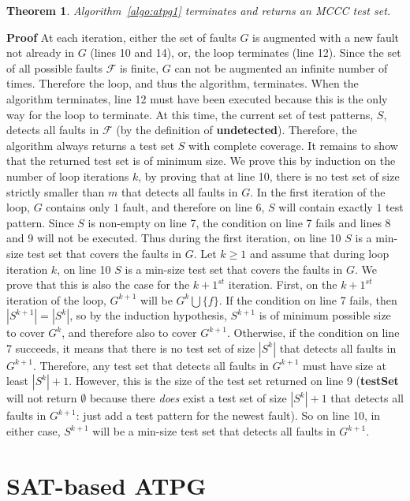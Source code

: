 \documentclass{article}
\newcommand{\MCCC}{\textsc{MCCC}\xspace}
\newcommand{\F}{\mathcal{F}}
\newtheorem{theorem}{Theorem}
\begin{document}
\begin{theorem}
Algorithm~\ref{algo:atpg1} terminates and returns an \MCCC test set.
\end{theorem}
\noindent \textbf{Proof} At each iteration, either the set of faults $G$ is augmented with a new fault not already in $G$ (lines 10 and 14), or, the loop terminates (line 12). Since the set of all possible faults $\F$ is finite, $G$ can not be augmented an infinite number of times. Therefore the loop, and thus the algorithm, terminates.  When the algorithm terminates, line 12 must have been executed because this is the only way for the loop to terminate. At this time, the current set of test patterns, $S$, detects all faults in $\F$ (by the definition of \textbf{undetected}). Therefore, the algorithm always returns a test set $S$ with complete coverage. It remains to show that the returned test set is of minimum size.  We prove this by induction on the number of loop iterations $k$, by proving that at line 10, there is no test set of size strictly smaller than $m$ that detects all faults in $G$. In the first iteration of the loop, $G$ contains only $1$ fault, and therefore on line 6, $S$ will contain exactly $1$ test pattern. Since $S$ is non-empty on line 7, the condition on line 7 fails and lines 8 and 9 will not be executed. Thus during the first iteration, on line 10 $S$ is a min-size test set that covers the faults in $G$. Let $k \geq 1$ and assume that during loop iteration $k$, on line 10 $S$ is a min-size test set that covers the faults in $G$. We prove that this is also the case for the $k+1^{st}$ iteration. First, on the $k+1^{st}$ iteration of the loop, $G^{k+1}$ will be $G^k \bigcup \{f\}$. If the condition on line 7 fails, then $|S^{k+1}| = |S^k|$, so by the induction hypothesis, $S^{k+1}$ is of minimum possible size to cover $G^k$, and therefore also to cover $G^{k+1}$. Otherwise, if the condition on line 7 succeeds, it means that there is no test set of size $|S^k|$ that detects all faults in $G^{k+1}$. Therefore, any test set that detects all faults in $G^{k+1}$ must have size at least $|S^k|+1$. However, this is the size of the test set returned on line 9 (\textbf{testSet} will not return $\emptyset$ because there \textit{does} exist a test set of size $|S^k|+1$ that detects all faults in $G^{k+1}$: just add a test pattern for the newest fault). So on line 10, in either case, $S^{k+1}$ will be a min-size test set that detects all faults in $G^{k+1}$.         

\section{SAT-based ATPG}
\end{document}

